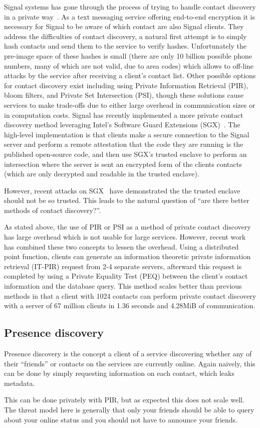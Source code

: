 Signal systems has gone through the process of trying to handle contact
discovery in a private way~\cite{marlinspike_2014}. As a text messaging service
offering end-to-end encryption it is necessary for Signal to be aware of which
contact are also Signal clients. They address the difficulties of contact
discovery, a natural first attempt is to simply hash contacts and send them to
the service to verify hashes. Unfortunately the pre-image space of these hashes
is small (there are only 10 billion possible phone numbers, many of which are
not valid, due to area codes) which allows to off-line attacks by the service
after receiving a client's contact list. Other possible options for contact
discovery exist including using Private Information Retrieval (PIR), bloom
filters, and Private Set Intersection (PSI), though these solutions cause
services to make trade-offs due to either large overhead in communication sizes
or in computation costs. Signal has recently implemented a more private contact
discovery method leveraging Intel's Software Guard Extensions
(SGX)~\cite{marlinspike_2017}. The high-level implementation is that clients
make a secure connection to the Signal server and perform a remote attestation
that the code they are running is the published open-source code, and then use
SGX's trusted enclave to perform an intersection where the server is sent an
encrypted form of the clients contacts (which are only decrypted and readable in
the trusted enclave). 

However, recent attacks on SGX~\cite{van2018foreshadow} have demonstrated the
the trusted enclave should not be so trusted. This leads to the natural question
of ``are there better methods of contact discovery?''. 

As stated above, the use of PIR or PSI as a method of private contact discovery
has large overhead which is not usable for large services. However, recent
work~\cite{demmler2018pir} has combined these two concepts to lessen the
overhead. Using a distributed point function, clients can generate an
information theoretic private information retrieval (IT-PIR) request from 2-4
separate servers, afterward this request is completed by using a Private
Equality Test (PEQ) between the client's contact information and the database
query. This method scales better than previous methods in that a client with
1024 contacts can perform private contact discovery with a server of 67 million
clients in 1.36 seconds and 4.28MiB of communication.

\subsection{Presence discovery}
Presence discovery is the concept a client of a service discovering whether any
of their ``friends'' or contacts on the services are currently online. Again
naively, this can be done by simply requesting information on each contact,
which leaks metadata.

This can be done privately with PIR, but as expected this does not scale well.
The threat model here is generally that only your friends should be able to
query about your online status and you should not have to announce your friends.

